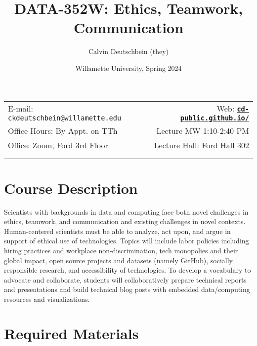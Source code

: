 \documentclass[11pt]{article}
\title{DATA-352W: Ethics, Teamwork, Communication}
\author{Calvin Deutschbein (they)}
\date{Willamette University, Spring 2024}
\newcommand{\blankline}{\quad\pagebreak[2]}
\begin{document}
\maketitle

\blankline

\begin{tabular*}{.93\textwidth}{@{\extracolsep{\fill}}lr}


E-mail: \texttt{ckdeutschbein@willamette.edu} & Web: \href{https://cd-public.github.io/l}{\tt\bf cd-public.github.io/}  \\

 Office Hours: By Appt. on TTh  &  Lecture MW 1:10-2:40 PM \\

 Office: Zoom, Ford 3rd Floor & Lecture Hall: Ford Hall 302\\
 & \\
&  \\
\hline
\end{tabular*}

\vspace{5 mm}


\section*{Course Description}

Scientists with backgrounds in data and computing face both novel challenges in ethics, teamwork, and communication and existing challenges in novel contexts. Human-centered scientists must be able to analyze, act upon, and argue in support of ethical use of technologies. Topics will include labor policies including hiring practices and workplace non-discrimination, tech monopolies and their global impact, open source projects and datasets (namely GitHub), socially responsible research, and accessibility of technologies. To develop a vocabulary to advocate and collaborate, students will collaboratively prepare technical reports and presentations and build technical blog posts with embedded data/computing resources and visualizations. 


\section*{Required Materials}
\end{document}
